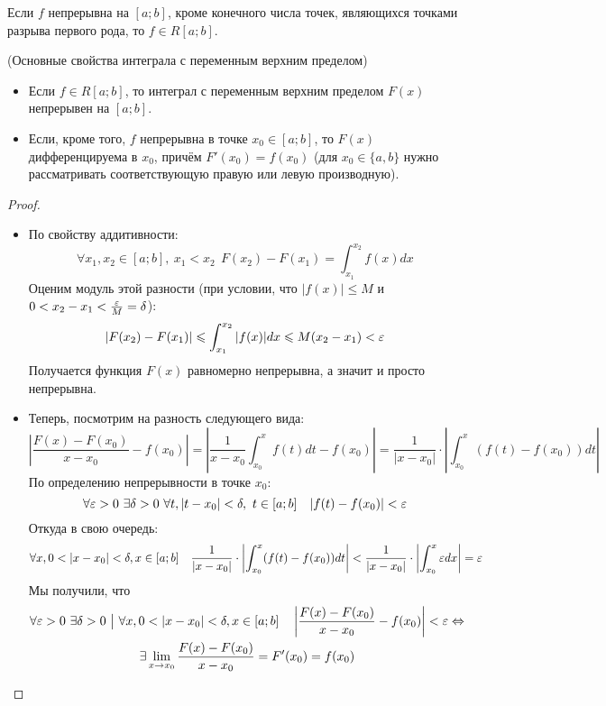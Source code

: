 \begin{corollary}
	Если $f$ непрерывна на $[a; b]$, кроме конечного числа точек, являющихся точками разрыва первого рода, то $f \in R[a; b]$.
\end{corollary}

\begin{theorem} (Основные свойства интеграла с переменным верхним пределом)
	\begin{itemize}
		\item Если $f \in R[a; b]$, то интеграл с переменным верхним пределом $F(x)$ непрерывен на $[a; b]$.
		
		\item Если, кроме того, $f$ непрерывна в точке $x_0 \in [a; b]$, то $F(x)$ дифференцируема в $x_0$, причём $F'(x_0) = f(x_0)$ (для $x_0 \in \{a, b\}$ нужно рассматривать соответствующую правую или левую производную).
	\end{itemize}
\end{theorem}

\begin{proof}~
	\begin{itemize}
		\item По свойству аддитивности:
		\[
			\forall x_1, x_2 \in [a; b],\ x_1 < x_2\ \ F(x_2) - F(x_1) = \int_{x_1}^{x_2} f(x)dx
		\]
		Оценим модуль этой разности (при условии, что $|f(x)| \le M$ и $0 < x_2 - x_1 < \frac{\varepsilon}{M} = \delta$):
		\[
			|F(x_2) - F(x_1)| \leqslant \int_{x_1}^{x_2} |f(x)|dx \leqslant M(x_2 - x_1) < \varepsilon
		\]
		Получается функция $F(x)$ равномерно непрерывна, а значит и просто непрерывна.
		
		\item Теперь, посмотрим на разность следующего вида:
		\[
			\left|\frac{F(x) - F(x_0)}{x - x_0} - f(x_0)\right| = \left|\frac{1}{x - x_0} \int_{x_0}^x f(t)dt - f(x_0)\right| = \frac{1}{|x - x_0|} \cdot \left|\int_{x_0}^x (f(t) - f(x_0))dt\right|
		\]
		По определению непрерывности в точке $x_0$:
		\[
			\forall \eps > 0\ \exists \delta > 0\ \forall t, |t - x_0| < \delta,\ t \in [a;b] \quad |f(t) - f(x_0)| < \eps
		\]
		Откуда в свою очередь:
		\[
			\forall x, 0 < |x - x_0| < \delta, x \in [a; b] \quad \frac{1}{|x - x_0|} \cdot \left|\int_{x_0}^x (f(t) - f(x_0))dt\right| < \frac{1}{|x - x_0|} \cdot \left|\int_{x_0}^x \varepsilon dx\right|  = \varepsilon
		\]
		Мы получили, что 
		\begin{multline*}
			\forall \varepsilon > 0\ \exists \delta > 0 \ \big|\  \forall x, 0 < |x - x_0| < \delta, x \in [a; b] \quad \left|\frac{F(x) - F(x_0)}{x - x_0} - f(x_0)\right| < \varepsilon \Leftrightarrow
			\\
			\exists \lim\limits_{x \to x_0} \frac{F(x) - F(x_0)}{x - x_0} = F'(x_0) = f(x_0)
		\end{multline*}
	\end{itemize}
\end{proof}

